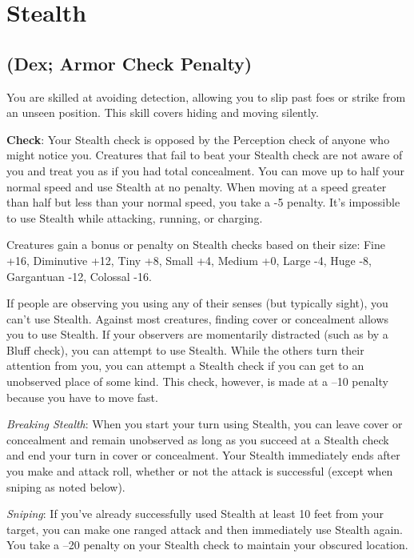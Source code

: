 \section{Stealth}

\label{f0}				
\subsection{(Dex; Armor Check Penalty)}

				
You are skilled at avoiding detection, allowing you to slip past foes or strike from an unseen position. This skill covers hiding and moving silently.
				
\textbf{Check}: Your Stealth check is opposed by the Perception check of anyone who might notice you. Creatures that fail to beat your Stealth check are not aware of you and treat you as if you had total concealment. You can move up to half your normal speed and use Stealth at no penalty. When moving at a speed greater than half but less than your normal speed, you take a -5 penalty. It's impossible to use Stealth while attacking, running, or charging.
				
Creatures gain a bonus or penalty on Stealth checks based on their size: Fine +16, Diminutive +12, Tiny +8, Small +4, Medium +0, Large -4, Huge -8, Gargantuan -12, Colossal -16.
				
If people are observing you using any of their senses (but typically sight), you can't use Stealth. Against most creatures, finding cover or concealment allows you to use Stealth. If your observers are momentarily distracted (such as by a Bluff check), you can attempt to use Stealth. While the others turn their attention from you, you can attempt a Stealth check if you can get to an unobserved place of some kind. This check, however, is made at a --10 penalty because you have to move fast.
				
\emph{Breaking Stealth}: When you start your turn using Stealth, you can leave cover or concealment and remain unobserved as long as you succeed at a Stealth check and end your turn in cover or concealment. Your Stealth immediately ends after you make and attack roll, whether or not the attack is successful (except when sniping as noted below).
				
\textit{Sniping}: If you've already successfully used Stealth at least 10 feet from your target, you can make one ranged attack and then immediately use Stealth again. You take a --20 penalty on your Stealth check to maintain your obscured location.
				
